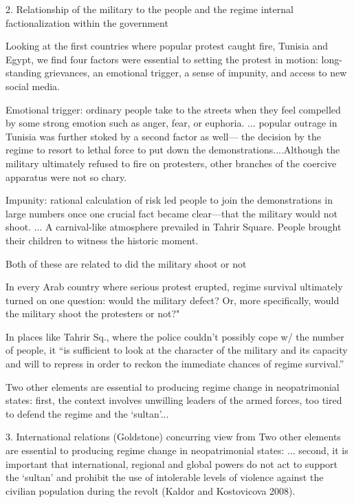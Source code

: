 			
	2. Relationship of the military to the people and the regime
		internal factionalization within the government \cite{battera_perspectives_2014}
		
		\cite{bellin_reconsidering_2012}
			Looking at the first countries where popular protest caught fire, Tunisia and Egypt, we find four factors were essential to setting the protest in motion: long-standing grievances, an emotional trigger, a sense of impunity, and access to new social media.
				
				Emotional trigger: ordinary people take to the streets when they feel compelled by some strong emotion such as anger, fear, or euphoria. ... popular outrage in Tunisia was further stoked by a second factor as well— the decision by the regime to resort to lethal force to put down the demonstrations....Although the military ultimately refused to fire on protesters, other branches of the coercive apparatus were not so chary.
				
				Impunity: rational calculation of risk led people to join the demonstrations in large numbers once one crucial fact became clear—that the military would not shoot. ... A carnival-like atmosphere prevailed in Tahrir Square. People brought their children to witness the historic moment.
				
				Both of these are related to did the military shoot or not
	
			In every Arab country where serious protest erupted, regime survival ultimately turned on one question: would the military defect? Or, more specifically, would the military shoot the protesters or not?"
					
					In places like Tahrir Sq., where the police couldn't possibly cope w/ the number of people, it ``is sufficient to look at the character of the military and its capacity and will to repress in order to reckon the immediate chances of regime survival.''
		
		\cite{comunello_will_2012}
			Two other elements are essential to producing regime change in neopatrimonial states: first, the context involves unwilling leaders of the armed forces, too tired to defend the regime and the ‘sultan’...

			
	3. International relations (Goldstone)
		concurring view from \cite{comunello_will_2012}
			Two other elements are essential to producing regime change in neopatrimonial states: ... second, it is important that international, regional and global powers do not act to support the ‘sultan’ and prohibit the use of intolerable levels of violence against the civilian population during the revolt (Kaldor and Kostovicova 2008).
			

